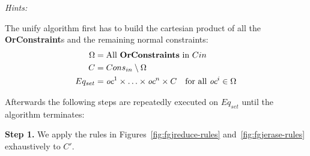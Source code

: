 \textit{Hints:}
\begin{itemize}
\end{itemize}
  

The unify algorithm first has to build the cartesian product of all the \textbf{OrConstraint}s and the remaining normal constraints:
\begin{align*}
\Omega &= \text{All }\mathbf{OrConstraints} \text{ in } C{in}\\
C &= {Cons}_{in} \setminus \Omega \\
Eq_{set} &= \textit{oc}^1 \times \ldots \times \textit{oc}^n \times C \quad \text{for all }\textit{oc}^i \in \Omega
\end{align*}

Afterwards the following steps are repeatedly executed on $Eq_{set}$ until the algorithm terminates:

\fi

\textbf{Step 1.} We apply the rules in Figures~\ref{fig:fgjreduce-rules}
and~\ref{fig:fgjerase-rules} exhaustively to $C'$.

